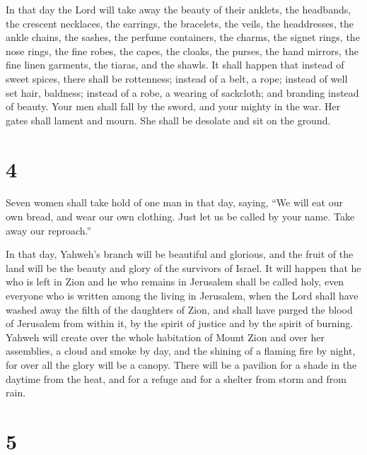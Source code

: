  In that day the Lord will take away the beauty of their
anklets, the headbands, the crescent necklaces,  the
earrings, the bracelets, the veils,  the headdresses, the
ankle chains, the sashes, the perfume containers, the charms,
 the signet rings, the nose rings,  the
fine robes, the capes, the cloaks, the purses,  the hand
mirrors, the fine linen garments, the tiaras, and the shawls.
 It shall happen that instead of sweet spices, there
shall be rottenness; instead of a belt, a rope; instead of well set
hair, baldness; instead of a robe, a wearing of sackcloth; and branding
instead of beauty.  Your men shall fall by the sword, and
your mighty in the war.  Her gates shall lament and
mourn. She shall be desolate and sit on the ground.

\hypertarget{section-3}{%
\section{4}\label{section-3}}

 Seven women shall take hold of one man in that day,
saying, ``We will eat our own bread, and wear our own clothing. Just let
us be called by your name. Take away our reproach.''

 In that day, Yahweh's branch will be beautiful and
glorious, and the fruit of the land will be the beauty and glory of the
survivors of Israel.  It will happen that he who is left
in Zion and he who remains in Jerusalem shall be called holy, even
everyone who is written among the living in Jerusalem, 
when the Lord shall have washed away the filth of the daughters of Zion,
and shall have purged the blood of Jerusalem from within it, by the
spirit of justice and by the spirit of burning.  Yahweh
will create over the whole habitation of Mount Zion and over her
assemblies, a cloud and smoke by day, and the shining of a flaming fire
by night, for over all the glory will be a canopy.  There
will be a pavilion for a shade in the daytime from the heat, and for a
refuge and for a shelter from storm and from rain.

\hypertarget{section-4}{%
\section{5}\label{section-4}}

